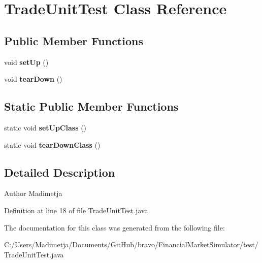 \hypertarget{class_trade_unit_test}{\section{Trade\+Unit\+Test Class Reference}
\label{class_trade_unit_test}
}
\subsection*{Public Member Functions}
\begin{DoxyCompactItemize}
\item 
\hypertarget{class_trade_unit_test_aef602b2b9e5555fc5da1bb749b611ccd}{void {\bfseries set\+Up} ()}\label{class_trade_unit_test_aef602b2b9e5555fc5da1bb749b611ccd}

\item 
\hypertarget{class_trade_unit_test_a34ba2c94e327c25a445241730d3953ef}{void {\bfseries tear\+Down} ()}\label{class_trade_unit_test_a34ba2c94e327c25a445241730d3953ef}

\end{DoxyCompactItemize}
\subsection*{Static Public Member Functions}
\begin{DoxyCompactItemize}
\item 
\hypertarget{class_trade_unit_test_a5be15b13c335f6325b1ee14ef9062a92}{static void {\bfseries set\+Up\+Class} ()}\label{class_trade_unit_test_a5be15b13c335f6325b1ee14ef9062a92}

\item 
\hypertarget{class_trade_unit_test_a12cc028ac0612978efa5400afd4baaa5}{static void {\bfseries tear\+Down\+Class} ()}\label{class_trade_unit_test_a12cc028ac0612978efa5400afd4baaa5}

\end{DoxyCompactItemize}


\subsection{Detailed Description}
\begin{DoxyAuthor}{Author}
Madimetja 
\end{DoxyAuthor}


Definition at line 18 of file Trade\+Unit\+Test.\+java.



The documentation for this class was generated from the following file\+:\begin{DoxyCompactItemize}
\item 
C\+:/\+Users/\+Madimetja/\+Documents/\+Git\+Hub/bravo/\+Financial\+Market\+Simulator/test/Trade\+Unit\+Test.\+java\end{DoxyCompactItemize}

